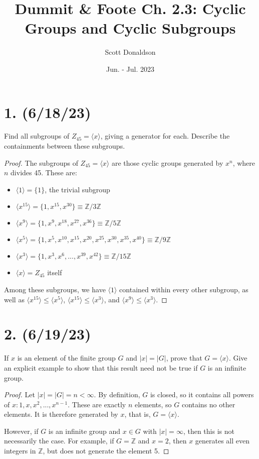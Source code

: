 \documentclass{article}
\title{Dummit \& Foote Ch. 2.3: Cyclic Groups and Cyclic Subgroups}
\author{Scott Donaldson}
\date{Jun. - Jul. 2023}
\begin{document}
\maketitle

\section*{1. (6/18/23)}

Find all subgroups of $Z_{45} = \langle x \rangle$, giving a generator for each. Describe the containments between these subgroups.

\begin{proof}
    The subgroups of $Z_{45} = \langle x \rangle$ are those cyclic groups generated by $x^n$, where $n$ divides 45. These are:
    \begin{itemize}[itemsep=0em]
        \item $\langle 1 \rangle = \{ 1 \}$, the trivial subgroup
        \item $\langle x^{15} \rangle = \{ 1, x^{15}, x^{30} \} \equiv \mathbb{Z}/3\mathbb{Z}$
        \item $\langle x^9 \rangle = \{ 1, x^9, x^{18}, x^{27}, x^{36} \} \equiv \mathbb{Z}/5\mathbb{Z}$
        \item $\langle x^5 \rangle = \{ 1, x^5, x^{10}, x^{15}, x^{20}, x^{25}, x^{30}, x^{35}, x^{40} \} \equiv \mathbb{Z}/9\mathbb{Z}$
        \item $\langle x^3 \rangle = \{ 1, x^3, x^6, ..., x^{39}, x^{42} \} \equiv \mathbb{Z}/15\mathbb{Z}$
        \item $\langle x \rangle = Z_{45}$ itself
    \end{itemize}
    Among these subgroups, we have $\langle 1 \rangle$ contained within every other subgroup, as well as $\langle x^{15} \rangle \leq \langle x^5 \rangle$, $\langle x^{15} \rangle \leq \langle x^3 \rangle$, and $\langle x^9 \rangle \leq \langle x^3 \rangle$.
\end{proof}

\section*{2. (6/19/23)}

If $x$ is an element of the finite group $G$ and $|x| = |G|$, prove that $G = \langle x \rangle$. Give an explicit example to show that this result need not be true if $G$ is an infinite group.

\begin{proof}
    Let $|x| = |G| = n < \infty$. By definition, $G$ is closed, so it contains all powers of $x: 1, x, x^2, ..., x^{n - 1}$. These are exactly $n$ elements, so $G$ contains no other elements. It is therefore generated by $x$, that is, $G = \langle x \rangle$.

    However, if $G$ is an infinite group and $x \in G$ with $|x| = \infty$, then this is not necessarily the case. For example, if $G = \mathbb{Z}$ and $x = 2$, then $x$ generates all even integers in $\mathbb{Z}$, but does not generate the element 5.
\end{proof}
\end{document}
